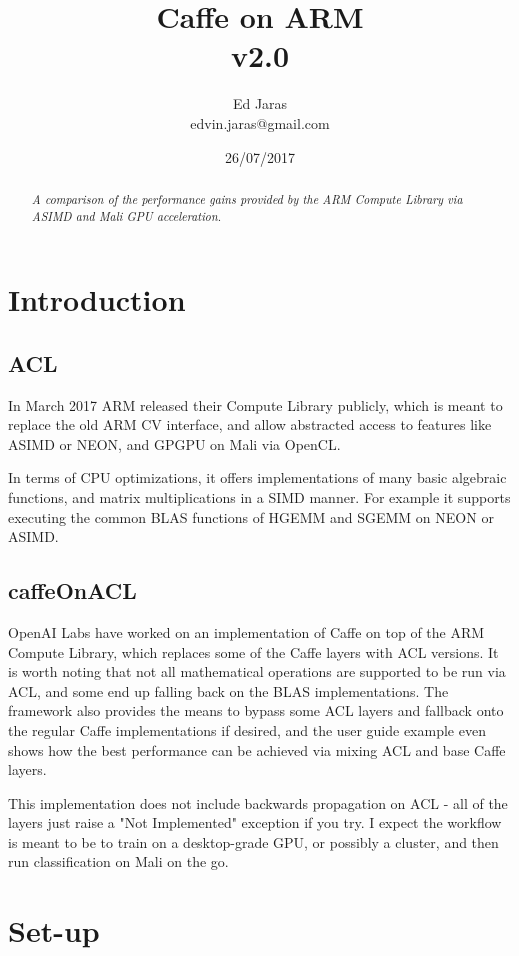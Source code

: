 \documentclass[12pt, a4paper, notitlepage]{report}
\title{Caffe on ARM \\ v2.0}
\author{Ed Jaras \\edvin.jaras@gmail.com}
\date{26/07/2017}
\begin{document}
\maketitle
\thispagestyle{empty}
\begin{abstract}
\textit{A comparison of the performance gains provided by the ARM Compute Library via ASIMD and Mali GPU acceleration.}
\end{abstract}
\section*{Introduction}
\subsection*{ACL}
In March 2017 ARM released their Compute Library publicly, which is meant to replace the old ARM CV interface, and allow abstracted access to features like ASIMD or NEON, and GPGPU on Mali via OpenCL.\cite{acl_post}

In terms of CPU optimizations, it offers implementations of many basic algebraic functions, and matrix multiplications in a SIMD manner. For example it supports executing the common BLAS functions of HGEMM and SGEMM on NEON or ASIMD.

\subsection*{caffeOnACL}
OpenAI Labs have worked on an implementation of Caffe on top of the ARM Compute Library, which replaces some of the Caffe layers with ACL versions. It is worth noting that not all mathematical operations are supported to be run via ACL, and some end up falling back on the BLAS implementations. The framework also provides the means to bypass some ACL layers and fallback onto the regular Caffe implementations if desired, and the user guide example even shows how the best performance can be achieved via mixing ACL and base Caffe layers.\cite{coacl}

This implementation does not include backwards propagation on ACL - all of the layers just raise a "Not Implemented" exception if you try. I expect the workflow is meant to be to train on a desktop-grade GPU, or possibly a cluster, and then run classification on Mali on the go.

\section*{Set-up}
\end{document}
